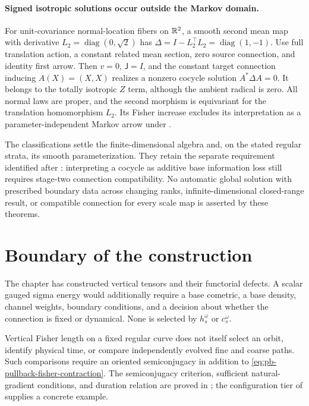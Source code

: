 \paragraph{Signed isotropic solutions occur outside the Markov domain.}
For unit-covariance normal-location fibers on $\mathbb R^2$, a smooth
second mean map with derivative $L_2=\operatorname{diag}(0,\sqrt2)$
has
$\Delta=I-L_2^\top L_2=\operatorname{diag}(1,-1)$.
Use full translation action, a constant related mean section,
zero source connection, and identity first arrow. Then $v=0$,
$\mathsf J=I$, and the constant target connection inducing
$A(X)=(X,X)$ realizes a nonzero cocycle solution
$A^*\Delta A=0$. It belongs to the totally isotropic $Z$ term,
although the ambient radical is zero. All normal laws are proper,
and the second morphism is equivariant for the translation
homomorphism $L_2$. Its Fisher increase excludes its interpretation
as a parameter-independent Markov arrow under
. 

The classifications settle the finite-dimensional algebra and,
on the stated regular strata, its smooth parameterization.
They retain the separate requirement identified after
: interpreting a cocycle as additive
base information loss still requires stage-two connection
compatibility. No automatic global solution with prescribed
boundary data across changing ranks, infinite-dimensional
closed-range result, or compatible connection for every scale
map is asserted by these theorems. 


\section{Boundary of the construction}
\label{sec:pb-boundary}

The chapter has constructed vertical tensors and their functorial defects.  A
scalar gauged sigma energy would additionally require a base cometric, a base
density, channel weights, boundary conditions, and a decision about whether
the connection is fixed or dynamical.  None is selected by
$h_s^\omega$ or $c_s^\omega$.  

Vertical Fisher length on a fixed regular curve does not itself select an
orbit, identify physical time, or compare independently evolved fine and
coarse paths. Such comparisons require an oriented semiconjugacy in addition
to \eqref{eq:pb-pullback-fisher-contraction}. The semiconjugacy criterion,
sufficient natural-gradient conditions, and duration relation are proved in
; the configuration tier of
 supplies a concrete example.


